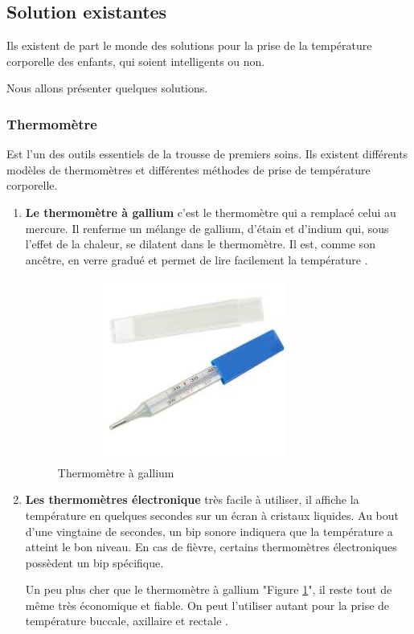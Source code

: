 \documentclass[12pt]{article}
\begin{document}
\subsection{Solution existantes}
Ils existent de part le monde des solutions pour la prise de la température corporelle des enfants, qui soient intelligents ou non.

Nous allons présenter quelques solutions.
\subsubsection{Thermomètre}
Est l’un des outils essentiels de la trousse de premiers soins. Ils existent différents modèles de thermomètres et différentes méthodes de prise de température corporelle.
\begin{enumerate}
	\item \textbf{Le thermomètre à gallium} c’est le thermomètre qui a remplacé celui au mercure. Il renferme un mélange de gallium, d’étain et d’indium qui, sous l’effet de la chaleur, se dilatent dans le thermomètre. Il est, comme son ancêtre, en verre gradué et permet de lire facilement la température \cite{36}.
	\begin{figure}[h]
		\centering
		\includegraphics[height=6cm,width=9cm]{img-Chapiter-2/galune.jpeg}
		\caption{Thermomètre à gallium}
		\label{fig:gallium}
	\end{figure}
	\newpage
	\item \textbf{Les thermomètres électronique} très facile à utiliser, il affiche la température en quelques secondes sur un écran à cristaux liquides. Au bout d’une vingtaine de secondes, un bip sonore indiquera que la température a atteint le bon niveau. En cas de fièvre, certains thermomètres électroniques possèdent un bip spécifique. 
	
Un peu plus cher que le thermomètre à gallium "Figure \ref{fig:gallium}", il reste tout de même très économique et fiable. On peut l’utiliser autant pour la prise de température buccale, axillaire et rectale \cite{36}.


\end{enumerate}
\end{document}
